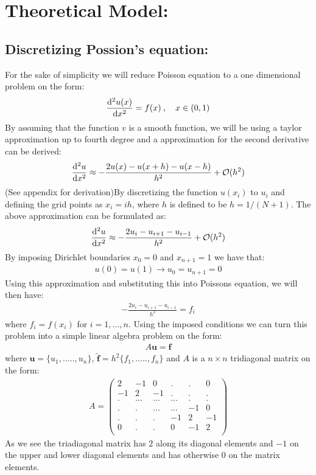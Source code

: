 \documentclass[a4paper, 10pt]{article}
\begin{document}
\section{Theoretical Model:}
\subsection{Discretizing Possion's equation:} For the sake of simplicity we will reduce Poisson equation to
a one dimensional problem on the form:
\begin{align}
  \dv[2]{u(x)}{x} = f(x) \: , \quad x \in (0,1)
\end{align}
By assuming that the function $v$ is a smooth function, we will be using a taylor approximation up to fourth degree
and a approximation for the second derivative can be derived:
\begin{align}
  \dv[2]{u}{x} \approx -\frac{2u(x) - u(x+h) - u(x-h)}{h^{2}} + \mathcal{O}(h^{2})
\end{align}
(See appendix for derivation)By discretizing the function $u(x_{i})$ to $u_{i}$ and defining the grid points as $x_{i} = ih$, where $h$ is defined to
be $h = 1/(N+1)$. The above approximation can be formulated as:
\begin{align}
  \dv[2]{u}{x} \approx  -\frac{2u_{i} - u_{i+1} - u_{i-1}}{h^{2}} + \mathcal{O}(h^{2})
\end{align}
By imposing Dirichlet boundaries $x_{0} = 0$ and $ x_{n+1} = 1$ we have that:
\begin{align}
  u(0) = u(1) \to u_{0} = u_{n+1} = 0
\end{align}
Using this approximation and substituting this into Poissons equation, we will
then have:
\begin{align}
  -\frac{2u_{i} - u_{i+1} - u_{i-1}}{h^{2}} = f_{i}
\end{align}
where $f_{i} = f(x_{i})$ for $i = 1,...,n$.
Using the imposed conditions we can turn this problem into a simple linear
algebra problem on the form:
\begin{align}
  A\mathbf{u} = \mathbf{f}
\end{align}
where $\mathbf{u} = \{u_{1},.....,u_{n}\}$,
$\tilde{\mathbf{f}} = h^{2}\{f_{1},.....,f_{n}\}$ and $A$ is a $n\times n$ tridiagonal matrix on the form:
\begin{align}
  A = \begin{pmatrix}
    2 & -1 &0&.&.& 0\\
    -1 & 2 &-1&.&.& .\\
    .& ... & ... & ...&.&.\\
    . & .& ... & ... & -1&0\\
    .& . & .& -1 & 2& -1\\
    0& . & .& 0& -1& 2\\
  \end{pmatrix}
\end{align}
As we see the triadiagonal matrix has $2$ along its diagonal elements and $-1$ on the upper and
lower diagonal elements and has otherwise $0$ on the matrix elements.
\end{document}
